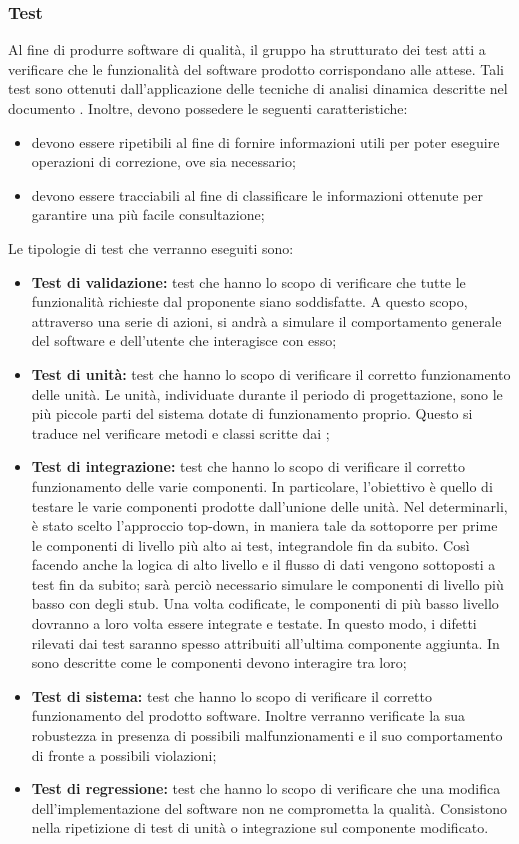 \documentclass[PdQ.tex]{subfiles}
\begin{document}
\subsubsection{Test}
Al fine di produrre software di qualità, il gruppo ha strutturato dei test atti a verificare che le funzionalità del software prodotto corrispondano alle attese.
Tali test sono ottenuti dall'applicazione delle tecniche di analisi dinamica descritte nel documento \NPdocRP{}. Inoltre, devono possedere le seguenti caratteristiche:
\begin{itemize}
	\item devono essere ripetibili al fine di fornire informazioni utili per poter eseguire operazioni di correzione, ove sia necessario;
	\item devono essere tracciabili al fine di classificare le informazioni ottenute per garantire una più facile consultazione;
\end{itemize}
Le tipologie di test che verranno eseguiti sono:
\begin{itemize}
\item \textbf{Test di validazione:} test che hanno lo scopo di verificare che tutte le funzionalità richieste dal proponente siano soddisfatte. A questo scopo, attraverso una serie di
azioni, si andrà a simulare il comportamento generale del software e dell'utente che interagisce con esso;
\item \textbf{Test di unità: } test che  hanno lo scopo di verificare il corretto funzionamento delle unità. Le unità, individuate durante il periodo di progettazione, sono le
		più piccole parti del sistema dotate di funzionamento proprio. Questo si traduce nel verificare metodi e classi scritte dai \PRP{};
\item \textbf{Test di integrazione: } test che hanno lo scopo di verificare il corretto funzionamento delle varie componenti. In particolare, l'obiettivo è quello di testare le varie componenti prodotte dall'unione delle unità. Nel determinarli, è stato scelto l'approccio top-down, in maniera tale da sottoporre per prime le componenti di livello più alto ai test, integrandole fin da subito. Così facendo anche la logica di alto livello e il flusso di dati vengono sottoposti a test fin da subito; sarà perciò necessario simulare le componenti di livello più basso con degli stub. Una volta codificate, le componenti di più basso livello dovranno a loro volta essere
integrate e testate. In questo modo, i difetti rilevati dai test saranno spesso attribuiti all'ultima componente aggiunta. In \DPdoc{} sono descritte come le componenti devono interagire tra loro;
\item \textbf{Test di sistema: }test che hanno lo scopo di verificare il corretto funzionamento del prodotto software. Inoltre verranno verificate la sua robustezza in presenza di
		possibili malfunzionamenti e il suo comportamento di fronte a possibili violazioni;
\item \textbf{Test di regressione: } test che hanno lo scopo di verificare che una modifica dell'implementazione del software non ne comprometta la qualità. Consistono nella ripetizione di test di unità o integrazione sul componente modificato.			
\end{itemize}
\end{document}
